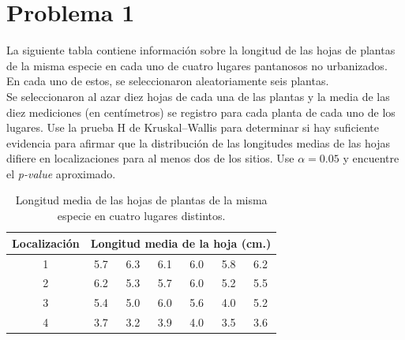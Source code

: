 \documentclass[a4paper,12pt]{article}
\newcommand{\head}[1]{\textnormal{\textbf{#1}}} %
\begin{document}
\section*{Problema 1} 
La siguiente tabla contiene información sobre la longitud de las hojas de plantas de la misma especie en cada uno de cuatro lugares pantanosos no urbanizados. En cada uno de estos, se seleccionaron aleatoriamente seis plantas. \\Se seleccionaron al azar diez hojas de cada una de las plantas y la media de las diez mediciones (en centímetros) se registro para cada planta de cada uno de los lugares. Use la prueba H de Kruskal–Wallis para determinar si hay suficiente evidencia para afirmar que la distribución de las longitudes medias de las hojas difiere en localizaciones para al menos dos de los sitios. Use \(\alpha =0.05\) y encuentre el \textit{p-value} aproximado.
\\
	\begin{table}[H]
			\centering
			\caption{Longitud media de las hojas de plantas de la misma especie en cuatro lugares distintos.}
			\begin{tabular}{c|cccccc}
				\toprule[1.5 pt]
				\multicolumn{1}{c}{\head{Localización}} &
				\multicolumn{6}{c}{\head{Longitud media de la hoja (cm.)}}\\
				\midrule
				1&5.7&6.3&6.1&6.0&5.8&6.2\\
				2&6.2&5.3&5.7&6.0&5.2&5.5\\
				3&5.4&5.0&6.0&5.6&4.0&5.2\\
				4&3.7&3.2&3.9&4.0&3.5&3.6\\
				\bottomrule[1.5pt]
			\end{tabular}
			\label{tab:my_label}
	\end{table}
\end{document}
